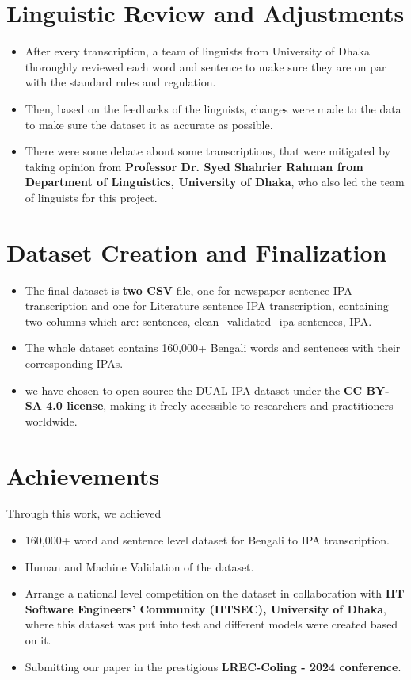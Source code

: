 \section{Linguistic Review and Adjustments}
\begin{itemize}
    \item After every transcription, a team of linguists from University of Dhaka thoroughly reviewed each word and sentence to make sure they are on par with the standard rules and regulation.
    \item Then, based on the feedbacks of the linguists, changes were made to the data to make sure the dataset it as accurate as possible.
    \item There were some debate about some transcriptions, that were mitigated by taking opinion from \textbf{Professor Dr. Syed Shahrier Rahman from Department of Linguistics, University of Dhaka}, who also led the team of linguists for this project.
\end{itemize}

\section{Dataset Creation and Finalization}
\begin{itemize}
    \item  The final dataset is \textbf{two CSV} file, one for newspaper sentence IPA transcription and one for Literature sentence IPA transcription, containing two columns which are: sentences, clean\_validated\_ipa sentences, IPA.
    \item The whole dataset contains 160,000+ Bengali words and sentences with their corresponding IPAs.
    \item we have chosen to open-source the DUAL-IPA dataset under the \textbf{CC BY-SA 4.0 license}, making it freely accessible to researchers and practitioners worldwide.
\end{itemize}

\section{Achievements}
Through this work, we achieved
\begin{itemize}
    \item 160,000+ word and sentence level dataset for Bengali to IPA transcription.
    \item Human and Machine Validation of the dataset.
    \item Arrange a national level competition on the dataset in collaboration with \textbf{IIT Software Engineers’ Community (IITSEC), University of Dhaka}, where this dataset was put into test and different models were created based on it.
    \item Submitting our paper in the prestigious \textbf{LREC-Coling - 2024 conference}.
\end{itemize}
